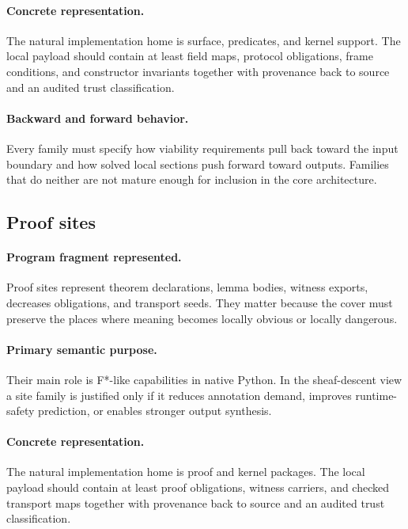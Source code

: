 \documentclass[11pt]{report}
\theoremstyle{definition}
\theoremstyle{plain}
\begin{document}
\paragraph{Concrete representation.}
The natural implementation home is surface, predicates, and kernel support. The local payload should contain
at least field maps, protocol obligations, frame conditions, and constructor invariants together with provenance back to source and an audited
trust classification.

\paragraph{Backward and forward behavior.}
Every family must specify how viability requirements pull back toward the
input boundary and how solved local sections push forward toward outputs.
Families that do neither are not mature enough for inclusion in the core
architecture.

\subsection{Proof sites}

\paragraph{Program fragment represented.}
Proof sites represent theorem declarations, lemma bodies, witness exports, decreases obligations, and transport seeds. They matter because the cover must preserve the
places where meaning becomes locally obvious or locally dangerous.

\paragraph{Primary semantic purpose.}
Their main role is F*-like capabilities in native Python. In the sheaf-descent view a site family is
justified only if it reduces annotation demand, improves runtime-safety
prediction, or enables stronger output synthesis.

\paragraph{Concrete representation.}
The natural implementation home is proof and kernel packages. The local payload should contain
at least proof obligations, witness carriers, and checked transport maps together with provenance back to source and an audited
trust classification.
\end{document}

